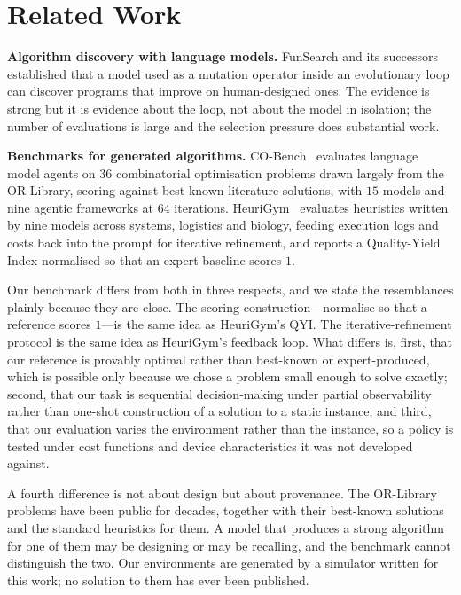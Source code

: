 \documentclass[conference]{IEEEtran}
\begin{document}
\section{Related Work}

\textbf{Algorithm discovery with language models.} FunSearch and its successors
established that a model used as a mutation operator inside an evolutionary loop can
discover programs that improve on human-designed ones. The evidence is strong but it is
evidence about the loop, not about the model in isolation; the number of evaluations is
large and the selection pressure does substantial work.

\textbf{Benchmarks for generated algorithms.} CO-Bench~\cite{cobench} evaluates language
model agents on $36$ combinatorial optimisation problems drawn largely from the
OR-Library, scoring against best-known literature solutions, with $15$ models and nine
agentic frameworks at $64$ iterations. HeuriGym~\cite{heurigym} evaluates heuristics
written by nine models across systems, logistics and biology, feeding execution logs and
costs back into the prompt for iterative refinement, and reports a Quality-Yield Index
normalised so that an expert baseline scores $1$.

Our benchmark differs from both in three respects, and we state the resemblances plainly
because they are close. The scoring construction---normalise so that a reference scores
$1$---is the same idea as HeuriGym's QYI. The iterative-refinement protocol is the same
idea as HeuriGym's feedback loop. What differs is, first, that our reference is provably
optimal rather than best-known or expert-produced, which is possible only because we chose
a problem small enough to solve exactly; second, that our task is sequential
decision-making under partial observability rather than one-shot construction of a
solution to a static instance; and third, that our evaluation varies the environment
rather than the instance, so a policy is tested under cost functions and device
characteristics it was not developed against.

A fourth difference is not about design but about provenance. The OR-Library problems
have been public for decades, together with their best-known solutions and the standard
heuristics for them. A model that produces a strong algorithm for one of them may be
designing or may be recalling, and the benchmark cannot distinguish the two. Our
environments are generated by a simulator written for this work; no solution to them has
ever been published.
\end{document}

